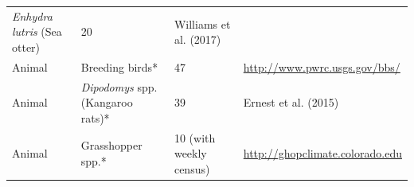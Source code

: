 \documentclass[12pt,]{article}
\begin{document}
\begin{longtable}[]{@{}llll@{}}
\begin{minipage}[t]{0.32\columnwidth}
\emph{Enhydra lutris} (Sea otter)\strut
\end{minipage} & \begin{minipage}[t]{0.22\columnwidth}\raggedright\strut
20\strut
\end{minipage} & \begin{minipage}[t]{0.28\columnwidth}\raggedright\strut
Williams et al. (2017)\strut
\end{minipage}\tabularnewline
\begin{minipage}[t]{0.06\columnwidth}\raggedright\strut
Animal\strut
\end{minipage} & \begin{minipage}[t]{0.32\columnwidth}\raggedright\strut
Breeding birds*\strut
\end{minipage} & \begin{minipage}[t]{0.22\columnwidth}\raggedright\strut
47\strut
\end{minipage} & \begin{minipage}[t]{0.28\columnwidth}\raggedright\strut
\url{http://www.pwrc.usgs.gov/bbs/}\strut
\end{minipage}\tabularnewline
\begin{minipage}[t]{0.06\columnwidth}\raggedright\strut
Animal\strut
\end{minipage} & \begin{minipage}[t]{0.32\columnwidth}\raggedright\strut
\emph{Dipodomys} spp. (Kangaroo rats)*\strut
\end{minipage} & \begin{minipage}[t]{0.22\columnwidth}\raggedright\strut
39\strut
\end{minipage} & \begin{minipage}[t]{0.28\columnwidth}\raggedright\strut
Ernest et al. (2015)\strut
\end{minipage}\tabularnewline
\begin{minipage}[t]{0.06\columnwidth}\raggedright\strut
Animal\strut
\end{minipage} & \begin{minipage}[t]{0.32\columnwidth}\raggedright\strut
Grasshopper spp.*\strut
\end{minipage} & \begin{minipage}[t]{0.22\columnwidth}\raggedright\strut
10 (with weekly census)\strut
\end{minipage} & \begin{minipage}[t]{0.28\columnwidth}\raggedright\strut
\url{http://ghopclimate.colorado.edu}\strut
\end{minipage}\tabularnewline

\end{longtable}
\end{document}
